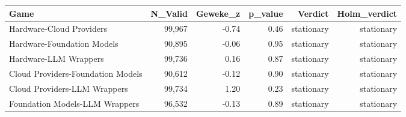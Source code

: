 

\begin{tabular}{@{}lrrrrr@{}}
\toprule
Game & N\_Valid & Geweke\_z & p\_value & Verdict & Holm\_verdict \\
\midrule
Hardware-Cloud Providers & 99,967 & -0.74 & 0.46 & stationary & stationary \\
Hardware-Foundation Models & 90,895 & -0.06 & 0.95 & stationary & stationary \\
Hardware-LLM Wrappers & 99,736 & 0.16 & 0.87 & stationary & stationary \\
Cloud Providers-Foundation Models & 90,612 & -0.12 & 0.90 & stationary & stationary \\
Cloud Providers-LLM Wrappers & 99,734 & 1.20 & 0.23 & stationary & stationary \\
Foundation Models-LLM Wrappers & 96,532 & -0.13 & 0.89 & stationary & stationary \\
\bottomrule
\end{tabular}
